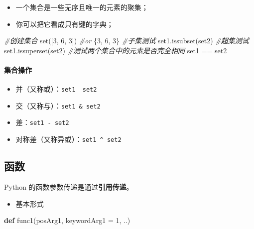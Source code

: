 \documentclass[utf-8]{ctexart}
\newenvironment{Shaded}{}{}
\newcommand{\KeywordTok}[1]{\textcolor[rgb]{0.00,0.44,0.13}{\textbf{#1}}}
\newcommand{\DecValTok}[1]{\textcolor[rgb]{0.25,0.63,0.44}{#1}}
\newcommand{\CommentTok}[1]{\textcolor[rgb]{0.38,0.63,0.69}{\textit{#1}}}
\newcommand{\OperatorTok}[1]{\textcolor[rgb]{0.40,0.40,0.40}{#1}}
\newcommand{\BuiltInTok}[1]{#1}
\newcommand{\NormalTok}[1]{#1}
\let\oldparagraph\paragraph
\renewcommand{\paragraph}[1]{\oldparagraph{#1}\mbox{}}
\begin{document}
\begin{itemize}
\item
  一个集合是一些无序且唯一的元素的聚集；
\item
  你可以把它看成只有键的字典；
\end{itemize}

\begin{Shaded}
\begin{Highlighting}[]
\CommentTok{#创建集合}
\BuiltInTok{set}\NormalTok{([}\DecValTok{3}\NormalTok{, }\DecValTok{6}\NormalTok{, }\DecValTok{3}\NormalTok{])}
\CommentTok{#or}
\NormalTok{\{}\DecValTok{3}\NormalTok{, }\DecValTok{6}\NormalTok{, }\DecValTok{3}\NormalTok{\}}
\CommentTok{#子集测试}
\NormalTok{set1.issubset(set2)}
\CommentTok{#超集测试}
\NormalTok{set1.issuperset(set2)}
\CommentTok{#测试两个集合中的元素是否完全相同}
\NormalTok{set1 }\OperatorTok{==}\NormalTok{ set2}
\end{Highlighting}
\end{Shaded}

\paragraph{集合操作}\label{header-n203}

\begin{itemize}
\item
  并（又称或）：\texttt{set1\ \textbar{}\ set2}
\item
  交（又称与）：\texttt{set1\ \&\ set2}
\item
  差：\texttt{set1\ -\ set2}
\item
  对称差（又称异或）：\texttt{set1\ \^{}\ set2}
\end{itemize}

\hypertarget{header-n217}{\subsection{函数}\label{header-n217}}

Python 的函数参数传递是通过\textbf{引用传递}。

\begin{itemize}
\item
  基本形式
\end{itemize}

\begin{Shaded}
\begin{Highlighting}[]
\KeywordTok{def}\NormalTok{ func1(posArg1, keywordArg1 }\OperatorTok{=} \DecValTok{1}\NormalTok{, ..)}
\end{Highlighting}
\end{Shaded}
\end{document}
